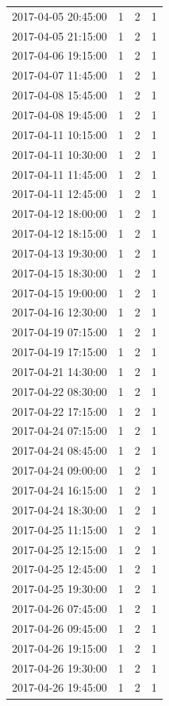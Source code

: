 \begin{tabular}{lrrr}
2017-04-05 20:45:00 & 1 & 2 & 1 \\
2017-04-05 21:15:00 & 1 & 2 & 1 \\
2017-04-06 19:15:00 & 1 & 2 & 1 \\
2017-04-07 11:45:00 & 1 & 2 & 1 \\
2017-04-08 15:45:00 & 1 & 2 & 1 \\
2017-04-08 19:45:00 & 1 & 2 & 1 \\
2017-04-11 10:15:00 & 1 & 2 & 1 \\
2017-04-11 10:30:00 & 1 & 2 & 1 \\
2017-04-11 11:45:00 & 1 & 2 & 1 \\
2017-04-11 12:45:00 & 1 & 2 & 1 \\
2017-04-12 18:00:00 & 1 & 2 & 1 \\
2017-04-12 18:15:00 & 1 & 2 & 1 \\
2017-04-13 19:30:00 & 1 & 2 & 1 \\
2017-04-15 18:30:00 & 1 & 2 & 1 \\
2017-04-15 19:00:00 & 1 & 2 & 1 \\
2017-04-16 12:30:00 & 1 & 2 & 1 \\
2017-04-19 07:15:00 & 1 & 2 & 1 \\
2017-04-19 17:15:00 & 1 & 2 & 1 \\
2017-04-21 14:30:00 & 1 & 2 & 1 \\
2017-04-22 08:30:00 & 1 & 2 & 1 \\
2017-04-22 17:15:00 & 1 & 2 & 1 \\
2017-04-24 07:15:00 & 1 & 2 & 1 \\
2017-04-24 08:45:00 & 1 & 2 & 1 \\
2017-04-24 09:00:00 & 1 & 2 & 1 \\
2017-04-24 16:15:00 & 1 & 2 & 1 \\
2017-04-24 18:30:00 & 1 & 2 & 1 \\
2017-04-25 11:15:00 & 1 & 2 & 1 \\
2017-04-25 12:15:00 & 1 & 2 & 1 \\
2017-04-25 12:45:00 & 1 & 2 & 1 \\
2017-04-25 19:30:00 & 1 & 2 & 1 \\
2017-04-26 07:45:00 & 1 & 2 & 1 \\
2017-04-26 09:45:00 & 1 & 2 & 1 \\
2017-04-26 19:15:00 & 1 & 2 & 1 \\
2017-04-26 19:30:00 & 1 & 2 & 1 \\
2017-04-26 19:45:00 & 1 & 2 & 1 \\

\end{tabular}
